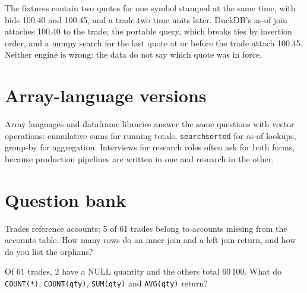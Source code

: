 \label{lst:iv:sql-and-data:asof}

\label{lst:iv:sql-and-data:portable}

\begin{example}\label{ex:iv:sql-and-data:tie}
The fixtures contain two quotes for one symbol stamped at the same time, with bids 100.40 and 100.45, and a trade two time
units later. DuckDB's as-of join attaches 100.40 to the trade; the portable query, which breaks ties by insertion order, and a
numpy search for the last quote at or before the trade attach 100.45. Neither engine is wrong: the data do not say which quote
was in force.
\end{example}

\section{Array-language versions}

Array languages and dataframe libraries answer the same questions with vector operations: cumulative sums for running totals,
\texttt{searchsorted} for as-of lookups, group-by for aggregation. Interviews for research roles often ask for both forms,
because production pipelines are written in one and research in the other.

\label{lst:iv:sql-and-data:numpy}

\section{Question bank}

\begin{interviewq}\label{iq:iv:sql-and-data:1}
Trades reference accounts; 5 of 61 trades belong to accounts missing from the accounts table. How many rows do an inner join and a
left join return, and how do you list the orphans?
\end{interviewq}

\begin{interviewq}\label{iq:iv:sql-and-data:2}
Of 61 trades, 2 have a NULL quantity and the others total 60\,100. What do \texttt{COUNT(*)}, \texttt{COUNT(qty)}, \texttt{SUM(qty)} and
\texttt{AVG(qty)} return?
\end{interviewq}

